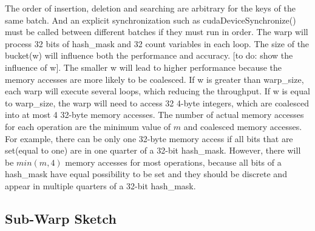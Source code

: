 \documentclass[conference]{IEEEtran}
\begin{document}
The order of insertion, deletion and searching are arbitrary for the keys of the same batch. And an explicit synchronization such as cudaDeviceSynchronize() must be called between different batches if they must run in order. 
The warp will process 32 bits of hash\_mask and 32 count variables in each loop. The size of the bucket(w) will influence both the performance and accuracy. [to do: show the influence of w]. The smaller w will lead to higher performance because the memory accesses are more likely to be coalesced. If w is greater than warp\_size, each warp will execute several loops, which reducing the throughput. If w is equal to warp\_size, the warp will need to access 32 4-byte integers, which are coalesced into at most 4 32-byte memory accesses. The number of actual memory accesses for each operation are the minimum value of $m$ and coalesced memory accesses. For example, there can be only one 32-byte memory access if all bits that are set(equal to one) are in one quarter of a 32-bit hash\_mask. However, there will be $min(m, 4)$ memory accesses for most operations, because all bits of a hash\_mask have equal possibility to be set and they should be discrete and appear in multiple quarters of a 32-bit hash\_mask.

\subsection{Sub-Warp Sketch}
\end{document}
